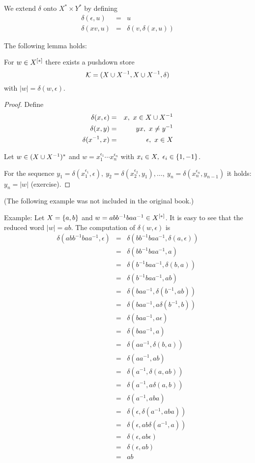 We extend $\delta$ onto $X^* \times Y^*$ by defining
\begin{eqnarray*}
\delta(\epsilon, u) & = & u \\
\delta(x v, u) & = & \delta(v,  \delta(x,u))
\end{eqnarray*}

The following lemma holds:
\begin{lemma}
For $w \in \mbox{${X}^{[*]}$}$ there exists a pushdown store
\[ \mbox{$\mathcal{K}$} =(X \cup {X}^{-1}, X \cup {X}^{-1}, \delta) \]
with $|w| = \delta(w, \epsilon)$.
\end{lemma}

\begin{proof}
Define
\begin{eqnarray}
\delta(x, \epsilon) & = & x,\ x\in X \cup {X}^{-1} \label{delta:1} \\
\delta(x, y) & = & yx,\ x\neq y^{-1} \label{delta:2}\\
\delta(x^{-1}, x) & = & \epsilon,\ x\in X \label{delta:3}
\end{eqnarray}

Let $w\in (X \cup {X}^{-1})^*$ and $w = x_1^{\epsilon_1} \cdots x_n^{\epsilon_n}$
with $x_i\in X,\ \epsilon_i\in \mbox{$\{1, -1\}$}$.

For the sequence $y_1 = \delta(x_1^{\epsilon_1}, \epsilon),\ y_2 =
\delta(x_2^{\epsilon_2}, y_1), \ldots,\ y_n = \delta(x_n^{\epsilon_n}, y_{n-1})$
it holds: $y_n = |w|$ (exercise).
\end{proof}

(The following example was not included in the original book.)

Example: Let $X=\mbox{$\{a,b\}$}$ and $w=abb^{-1}baa^{-1}\in \mbox{${X}^{[*]}$}$. It is
easy to see that the reduced word $|w|=ab$. The computation of $\delta(w,\epsilon)$ is
\begin{eqnarray*}
\delta(abb^{-1}baa^{-1}, \epsilon)
&=&\delta(bb^{-1}baa^{-1}, \delta(a,\epsilon)) \\
&=&\delta(bb^{-1}baa^{-1}, a) \\
&=&\delta(b^{-1}baa^{-1}, \delta(b, a)) \\
&=&\delta(b^{-1}baa^{-1}, ab)\\
&=&\delta(baa^{-1}, \delta(b^{-1}, ab)) \\
&=&\delta(baa^{-1}, a \delta(b^{-1}, b)) \\
&=&\delta(baa^{-1}, a \epsilon) \\
&=&\delta(baa^{-1}, a) \\
&=&\delta(aa^{-1}, \delta(b,a)) \\
&=&\delta(aa^{-1}, a b) \\
&=&\delta(a^{-1}, \delta(a,ab)) \\
&=&\delta(a^{-1}, a \delta(a,b)) \\
&=&\delta(a^{-1}, a b a) \\
&=&\delta(\epsilon, \delta(a^{-1}, aba)) \\
&=&\delta(\epsilon, a b \delta(a^{-1}, a)) \\
&=&\delta(\epsilon, a b \epsilon) \\
&=&\delta(\epsilon, a b) \\
&=&a b \\
\end{eqnarray*}

